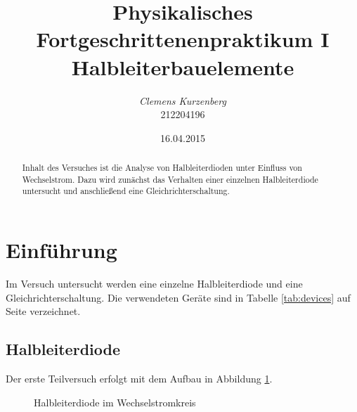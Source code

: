 \documentclass[10pt,a4paper]{scrartcl}
\title {Physikalisches Fortgeschrittenenpraktikum I\linebreak
Halbleiterbauelemente}
\author {\emph{Clemens Kurzenberg}\\212204196}
\date {16.04.2015}
\begin{document}
\maketitle

\begin{abstract}
Inhalt des Versuches ist die Analyse von Halbleiterdioden unter Einfluss von
Wechselstrom.
Dazu wird zunächst das Verhalten einer einzelnen Halbleiterdiode untersucht
und anschließend eine Gleichrichterschaltung.
\end{abstract}

\tableofcontents

\pagebreak
\listoffigures
\listoftables

\pagebreak
\section {Einführung}

Im Versuch untersucht werden eine einzelne Halbleiterdiode und eine
Gleichrichterschaltung.
Die verwendeten Geräte sind in Tabelle \ref{tab:devices} auf Seite
\pageref{tab:devices} verzeichnet.

\subsection {Halbleiterdiode}

Der erste Teilversuch erfolgt mit dem Aufbau in Abbildung \ref{fig:HL_Diode}.

\begin{figure}[!ht]
    \centering
    \caption{Halbleiterdiode im Wechselstromkreis} \label{fig:HL_Diode}
\end{figure}
\end{document}
